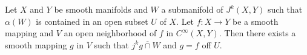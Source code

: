 Let $X$ and $Y$ be smooth manifolds and $W$ a submanifold of $J^{k}(X, Y)$ such that $\alpha(W)$ is contained in an open subset $U$ of $X$. Let $f: X \to Y$ be a smooth mapping and $V$ an open neighborhood of $f$ in $C^{\infty}(X, Y)$. Then there exists a smooth mapping $g$ in $V$ such that $j^{k} g \mathrel{\overline{\cap}} W$ and $g = f$ off $U$.
